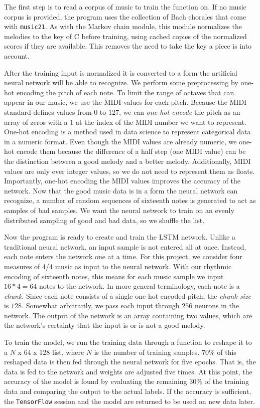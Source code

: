 The first step is to read a corpus of music to train the function on.
If no music corpus is provided, the program uses the collection of Bach chorales that come with \texttt{music21}.
As with the Markov chain module, this module normalizes the melodies to the key of C before training, using cached copies of the normalized scores if they are available.
This removes the need to take the key a piece is into account.

After the training input is normalized it is converted to a form the artificial neural network will be able to recognize.
We perform some preprocessing by one-hot encoding the pitch of each note.
To limit the range of octaves that can appear in our music, we use the MIDI values for each pitch.
Because the MIDI standard defines values from $0$ to $127$, we can \textit{one-hot encode} the pitch as an array of zeros with a $1$ at the index of the MIDI number we want to represent.
One-hot encoding is a method used in data science to represent categorical data in a numeric format.
Even though the MIDI values are already numeric, we one-hot encode them because the difference of a half step (one MIDI value) can be the distinction between a good melody and a better melody.
Additionally, MIDI values are only ever integer values, so we do not need to represent them as floats.
Importantly, one-hot encoding the MIDI values improves the accuracy of the network.
Now that the good music data is in a form the neural network can recognize, a number of random sequences of sixteenth notes is generated to act as samples of bad samples.
We want the neural network to train on an evenly distributed sampling of good and bad data, so we shuffle the list.

Now the program is ready to create and train the LSTM network.
Unlike a traditional neural network, an input sample is not entered all at once.
Instead, each note enters the network one at a time.
For this project, we consider four measures of 4/4 music as input to the neural network.
With our rhythmic encoding of sixteenth notes, this means for each music sample we input $16 * 4 = 64$ notes to the network.
In more general terminology, each note is a \textit{chunk}.
Since each note consists of a single one-hot encoded pitch, the \textit{chunk size} is $128$.
Somewhat arbitrarily, we pass each input through $256$ neurons in the network.
The output of the network is an array containing two values, which are the network's certainty that the input is or is not a good melody.

To train the model, we run the training data through a function to reshape it to a $N$ x 64 x 128 list, where $N$ is the number of training samples.
$70\%$ of this reshaped data is then fed through the neural network for five epochs.
That is, the data is fed to the network and weights are adjusted five times.
At this point, the accuracy of the model is found by evaluating the remaining $30\%$ of the training data and comparing the output to the actual labels.
If the accuracy is sufficient, the \texttt{TensorFlow} session and the model are returned to be used on new data later.

